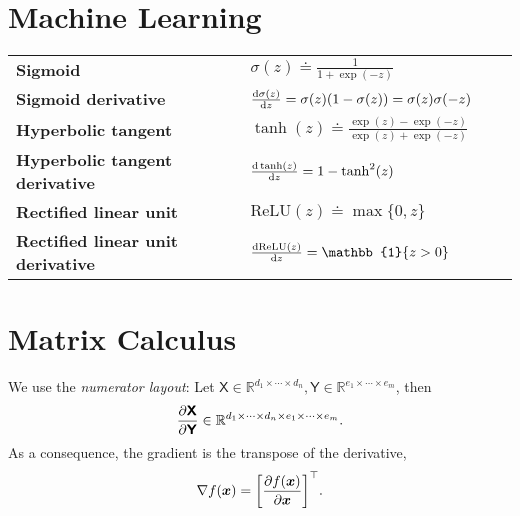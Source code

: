 \documentclass{article}
\newcommand{\lft}{\mathopen{}\mathclose\bgroup\left}
\newcommand{\rgt}{\aftergroup\egroup\right}
\newcommand{\R}{\mathbb{R}}
\renewcommand{\vec}[1]{\bm{#1}}
\newcommand{\tens}[1]{\bm{\mathsf{#1}}}
\newcommand{\transpose}[1]{#1^\top}
\begin{document}
\section*{Machine Learning}

\begin{xltabular}{\textwidth}{@{}llXr@{}}
    \toprule
    \textbf{Sigmoid}                          & $\sigma(z) \doteq \frac{1}{1 + \exp(-z)}$                               & & \\
    \textbf{Sigmoid derivative}               & $\odv{\sigma(z)}{z} = \sigma(z) (1 - \sigma(z)) = \sigma(z) \sigma(-z)$ & & \\
    \textbf{Hyperbolic tangent}               & $\tanh(z) \doteq \frac{\exp(z) - \exp(-z)}{\exp(z) + \exp(-z)}$         & & \\
    \textbf{Hyperbolic tangent derivative}    & $\odv{\tanh(z)}{z} = 1 - \tanh^2(z)$                                    & & \\
    \textbf{Rectified linear unit}            & $\mathrm{ReLU}(z) \doteq \max \{ 0, z \}$                               & & \\
    \textbf{Rectified linear unit derivative} & $\odv{\mathrm{ReLU}(z)}{z} = \mathbb{1} \{ z > 0 \}$                    & & \\
    \bottomrule
\end{xltabular}

\section*{Matrix Calculus}

We use the \textit{numerator layout}: Let $\tens{X} \in \R^{d_1 \times \cdots \times d_n}, \tens{Y}
    \in \R^{e_1 \times \cdots \times e_m}$, then \[
    \pdv{\tens{X}}{\tens{Y}} \in \R^{d_1 \times \cdots \times d_n \times e_1 \times \cdots \times e_m}.
\]
As a consequence, the gradient is the transpose of the derivative, \[
    \nabla f(\vec{x}) = \transpose{\lft[ \pdv{f(\vec{x})}{\vec{x}} \rgt]}.
\]
\end{document}
